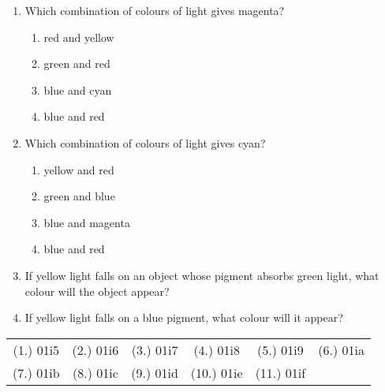 \begin{eocexercises}{}
\begin{enumerate}
\item{
Which combination of colours of light gives magenta?
\renewcommand{\labelenumii}{\Alph{enumii}}
\begin{enumerate}
\item red and yellow
\item green and red
\item blue and cyan
\item blue and red
\end{enumerate}
}

\item{
Which combination of colours of light gives cyan?
\renewcommand{\labelenumii}{\Alph{enumii}}
\begin{enumerate}
\item yellow and red
\item green and blue
\item blue and magenta
\item blue and red
\end{enumerate}
}

\item{If yellow light falls on an object whose pigment absorbs green light, what colour will the object appear?}

\item{If yellow light falls on a blue pigment, what colour will it appear?}

\end{enumerate}

\par \practiceinfo
\par \begin{tabular}[h]{cccccc}
(1.)	01i5	&
(2.)	01i6	&
(3.)	01i7	&
(4.)	01i8	&
(5.)	01i9	&
(6.)	01ia	\\ %
(7.)	01ib	&
(8.)	01ic	&
(9.)	01id	&
(10.)	01ie	&
(11.)	01if	&
\end{tabular}

\end{eocexercises}


